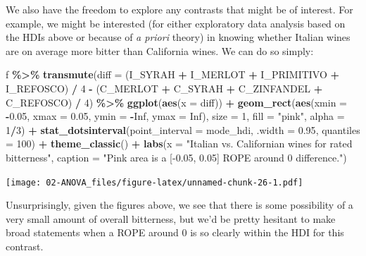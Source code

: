 \documentclass[
]{book}
\newenvironment{Shaded}{\begin{snugshade}}{\end{snugshade}}
\newcommand{\AttributeTok}[1]{\textcolor[rgb]{0.13,0.29,0.53}{#1}}
\newcommand{\ConstantTok}[1]{\textcolor[rgb]{0.56,0.35,0.01}{#1}}
\newcommand{\DecValTok}[1]{\textcolor[rgb]{0.00,0.00,0.81}{#1}}
\newcommand{\FloatTok}[1]{\textcolor[rgb]{0.00,0.00,0.81}{#1}}
\newcommand{\FunctionTok}[1]{\textcolor[rgb]{0.13,0.29,0.53}{\textbf{#1}}}
\newcommand{\NormalTok}[1]{#1}
\newcommand{\SpecialCharTok}[1]{\textcolor[rgb]{0.81,0.36,0.00}{\textbf{#1}}}
\newcommand{\StringTok}[1]{\textcolor[rgb]{0.31,0.60,0.02}{#1}}
\begin{document}
We also have the freedom to explore any contrasts that might be of interest. For example, we might be interested (for either exploratory data analysis based on the HDIs above or because of \emph{a priori} theory) in knowing whether Italian wines are on average more bitter than California wines. We can do so simply:

\begin{Shaded}
\begin{Highlighting}[]
\NormalTok{f }\SpecialCharTok{\%\textgreater{}\%}
  \FunctionTok{transmute}\NormalTok{(}\AttributeTok{diff =}\NormalTok{ (I\_SYRAH }\SpecialCharTok{+}\NormalTok{ I\_MERLOT }\SpecialCharTok{+}\NormalTok{ I\_PRIMITIVO }\SpecialCharTok{+}\NormalTok{ I\_REFOSCO) }\SpecialCharTok{/} \DecValTok{4} \SpecialCharTok{{-}} 
\NormalTok{              (C\_MERLOT }\SpecialCharTok{+}\NormalTok{ C\_SYRAH }\SpecialCharTok{+}\NormalTok{ C\_ZINFANDEL }\SpecialCharTok{+}\NormalTok{ C\_REFOSCO) }\SpecialCharTok{/} \DecValTok{4}\NormalTok{) }\SpecialCharTok{\%\textgreater{}\%}
  \FunctionTok{ggplot}\NormalTok{(}\FunctionTok{aes}\NormalTok{(}\AttributeTok{x =}\NormalTok{ diff)) }\SpecialCharTok{+} 
  \FunctionTok{geom\_rect}\NormalTok{(}\FunctionTok{aes}\NormalTok{(}\AttributeTok{xmin =} \SpecialCharTok{{-}}\FloatTok{0.05}\NormalTok{, }\AttributeTok{xmax =} \FloatTok{0.05}\NormalTok{,}
                \AttributeTok{ymin =} \SpecialCharTok{{-}}\ConstantTok{Inf}\NormalTok{, }\AttributeTok{ymax =} \ConstantTok{Inf}\NormalTok{), }
            \AttributeTok{size =} \DecValTok{1}\NormalTok{, }\AttributeTok{fill =} \StringTok{"pink"}\NormalTok{, }\AttributeTok{alpha =} \DecValTok{1}\SpecialCharTok{/}\DecValTok{3}\NormalTok{) }\SpecialCharTok{+} 
  \FunctionTok{stat\_dotsinterval}\NormalTok{(}\AttributeTok{point\_interval =}\NormalTok{ mode\_hdi, }\AttributeTok{.width =} \FloatTok{0.95}\NormalTok{, }\AttributeTok{quantiles =} \DecValTok{100}\NormalTok{) }\SpecialCharTok{+} 
  \FunctionTok{theme\_classic}\NormalTok{() }\SpecialCharTok{+}
  \FunctionTok{labs}\NormalTok{(}\AttributeTok{x =} \StringTok{"Italian vs. Californian wines for rated bitterness"}\NormalTok{,}
       \AttributeTok{caption =} \StringTok{"Pink area is a [{-}0.05, 0.05] ROPE around 0 difference."}\NormalTok{)}
\end{Highlighting}
\end{Shaded}

\texttt{[image: 02-ANOVA\_files/figure-latex/unnamed-chunk-26-1.pdf]}

Unsurprisingly, given the figures above, we see that there is some possibility of a very small amount of overall bitterness, but we'd be pretty hesitant to make broad statements when a ROPE around 0 is so clearly within the HDI for this contrast.
\end{document}
